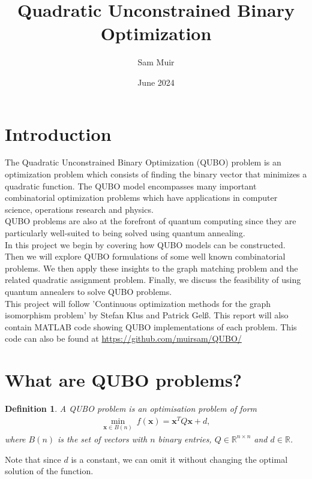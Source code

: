 \documentclass{article}
\title{Quadratic Unconstrained Binary Optimization}
\author{Sam Muir }
\date{June 2024}
\newtheorem{defn}[prop]{Definition}
\begin{document}
\maketitle

\section{Introduction}

The Quadratic Unconstrained Binary Optimization (QUBO) problem is an optimization problem which consists of finding the binary vector that minimizes a quadratic function.
The QUBO model encompasses many important combinatorial optimization problems which have applications in computer science, operations research and physics.\\
QUBO problems are also at the forefront of quantum computing since they are particularly well-suited to being solved using quantum annealing.\\

\noindent In this project we begin by covering how QUBO models can be constructed. Then we will explore QUBO formulations of some well known combinatorial problems. We then apply these insights to the graph matching problem and the related quadratic assignment problem. Finally, we discuss the feasibility of using quantum annealers to solve QUBO problems. \\

\noindent This project will follow 'Continuous optimization methods for the graph isomorphism problem' by Stefan Klus and Patrick Gelß. This report will also contain MATLAB code showing QUBO implementations of each problem. This code can also be found at \href{https://github.com/muirsam/QUBO/}{https://github.com/muirsam/QUBO/}

\section{What are QUBO problems?}
\begin{defn}
A QUBO problem is an optimisation problem of form
\begin{align*}
    \min_{\mathbf{x} \in B(n)} \: f(\mathbf{x}) = \mathbf{x}^T Q \mathbf{x} + d,
\end{align*}
where \(B(n)\) is the set of vectors with \(n\) binary entries, \(Q \in \mathbb{R}^{n \times n}\) and \(d \in \mathbb{R}\).
\end{defn}

\noindent Note that since \(d\) is a constant, we can omit it without changing the optimal solution of the function.\\
\end{document}
